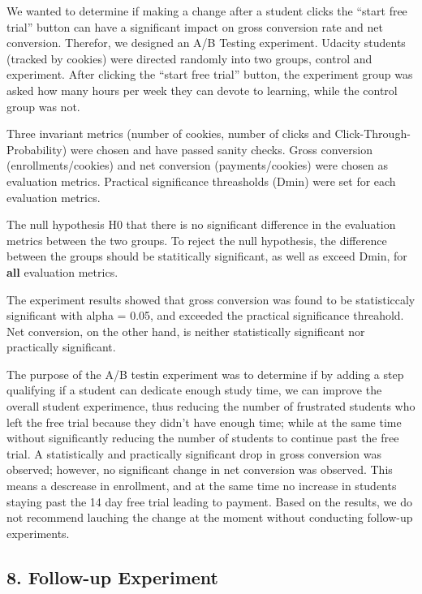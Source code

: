 \documentclass[11pt]{article}
\begin{document}
    We wanted to determine if making a change after a student clicks the
``start free trial'' button can have a significant impact on gross
conversion rate and net conversion. Therefor, we designed an A/B Testing
experiment. Udacity students (tracked by cookies) were directed randomly
into two groups, control and experiment. After clicking the ``start free
trial'' button, the experiment group was asked how many hours per week
they can devote to learning, while the control group was not.

Three invariant metrics (number of cookies, number of clicks and
Click-Through-Probability) were chosen and have passed sanity checks.
Gross conversion (enrollments/cookies) and net conversion
(payments/cookies) were chosen as evaluation metrics. Practical
significance threasholds (Dmin) were set for each evaluation metrics.

The null hypothesis H0 that there is no significant difference in the
evaluation metrics between the two groups. To reject the null
hypothesis, the difference between the groups should be statitically
significant, as well as exceed Dmin, for \textbf{all} evaluation
metrics.

The experiment results showed that gross conversion was found to be
statisticcaly significant with alpha = 0.05, and exceeded the practical
significance threahold. Net conversion, on the other hand, is neither
statistically significant nor practically significant.

    The purpose of the A/B testin experiment was to determine if by adding a
step qualifying if a student can dedicate enough study time, we can
improve the overall student experimence, thus reducing the number of
frustrated students who left the free trial because they didn't have
enough time; while at the same time without significantly reducing the
number of students to continue past the free trial. A statistically and
practically significant drop in gross conversion was observed; however,
no significant change in net conversion was observed. This means a
descrease in enrollment, and at the same time no increase in students
staying past the 14 day free trial leading to payment. Based on the
results, we do not recommend lauching the change at the moment without
conducting follow-up experiments.

    \hypertarget{follow-up-experiment}{%
\subsection{8. Follow-up Experiment}\label{follow-up-experiment}}
\end{document}
